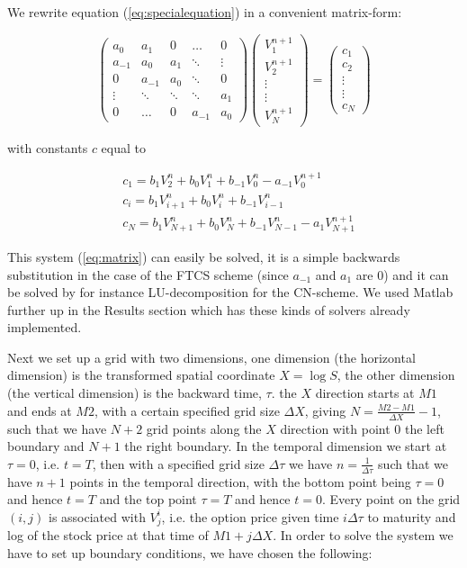 \documentclass[11pt,a4paper]{article}
\begin{document}
We rewrite equation (\ref{eq:specialequation}) in a convenient matrix-form:

\begin{equation}
\label{eq:matrix}
\begin{pmatrix} 
a_0 & a_1 & 0 & \hdots & 0 \\ 
a_{-1} & a_0 & a_1 & \ddots & \vdots \\
0 & a_{-1} & a_0 & \ddots & 0\\
\vdots & \ddots & \ddots & \ddots & a_1 \\
0 & \hdots & 0 & a_{-1} & a_0
\end{pmatrix}
\begin{pmatrix}
V^{n+1}_1 \\
V^{n+1}_2 \\
\vdots \\
\vdots \\
V^{n+1}_N
\end{pmatrix}
=
\begin{pmatrix}
c_1 \\
c_2 \\
\vdots \\
\vdots \\
c_N
\end{pmatrix}
\end{equation}

with constants $c$ equal to

\begin{align*}
  &c_1 = b_1V^n_2 + b_0V^n_1 + b_{-1}V^n_0 - a_{-1}V^{n+1}_0 \\
  &c_i = b_1V^n_{i+1} + b_0V^n_i + b_{-1}V^n_{i-1} \\
  &c_N = b_1V^n_{N+1} + b_0V^n_N + b_{-1}V^n_{N-1} - a_1V^{n+1}_{N+1}
\end{align*}

This system (\ref{eq:matrix}) can easily be solved, it is a simple backwards substitution in the case of the FTCS scheme (since $a_{-1}$ and $a_1$ are 0) and it can be solved by for instance LU-decomposition for the CN-scheme. We used Matlab further up in the Results section which has these kinds of solvers already implemented.

Next we set up a grid with two dimensions, one dimension (the horizontal dimension) is the transformed spatial coordinate $X = \log{S}$, the other dimension (the vertical dimension) is the backward time, $\tau$. the $X$ direction starts at $M1$ and ends at $M2$, with a certain specified grid size $\Delta X$, giving $N = \frac{M2 - M1}{\Delta X} - 1$, such that we have $N+2$ grid points along the $X$ direction with point 0 the left boundary and $N+1$ the right boundary. In the temporal dimension we start at $\tau = 0$, i.e. $t = T$, then with a specified grid size $\Delta \tau$ we have $n = \frac{1}{\Delta \tau}$ such that we have $n + 1$ points in the temporal direction, with the bottom point being $\tau = 0$ and hence $t = T$ and the top point $\tau = T$ and hence $t = 0$. Every point on the grid $(i,j)$ is associated with $V^i_j$, i.e. the option price given time $i\Delta \tau$ to maturity and log of the stock price at that time of $M1 + j\Delta X$. In order to solve the system we have to set up boundary conditions, we have chosen the following:
\end{document}
